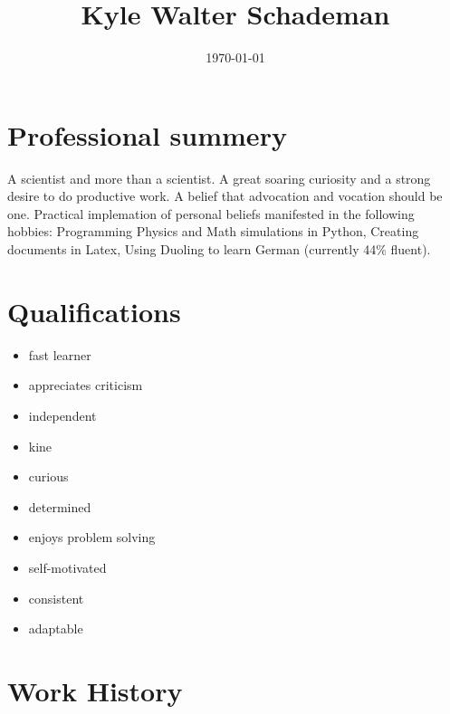 \documentclass[8pt]{article}
\begin{document}
    \title{Kyle Walter Schademan}
    \date{\today}
    \maketitle
\section{Professional summery}\label{sec:int}

A scientist and more than a scientist.  A great soaring curiosity and a strong desire to do productive work.  A belief that advocation and vocation should be one.  Practical implemation of personal beliefs manifested in the following hobbies: Programming Physics and Math simulations in Python, Creating documents in Latex, Using Duoling to learn German (currently 44\% fluent).

\section{Qualifications}\label{sec:int}
    
    \begin{multicols}{2}
        \begin{itemize}
          \item fast learner
          \item appreciates criticism
          \item independent
          \item kine
          \item curious
          \item determined
          \item enjoys problem solving
          \item self-motivated
          \item consistent
          \item adaptable
        \end{itemize}
    \end{multicols}

\section{Work History}
    
\end{document}
